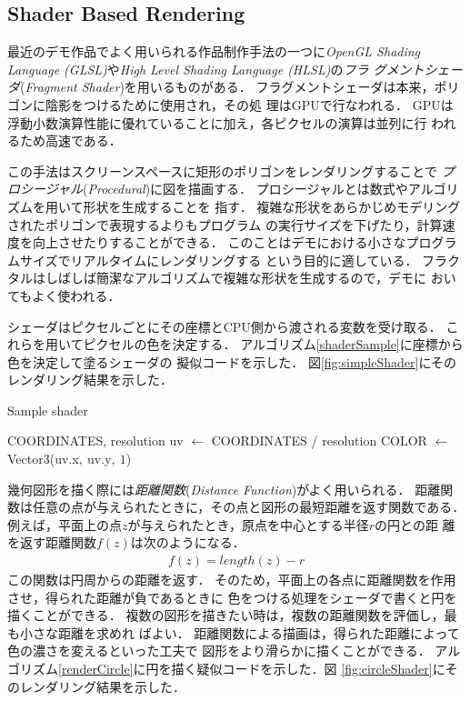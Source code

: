 \subsection{Shader Based Rendering}

最近のデモ作品でよく用いられる作品制作手法の一つに\textit{OpenGL Shading
Language (GLSL)}や\textit{High Level Shading Language (HLSL)}の\emph{フラ
グメントシェーダ}(\textit{Fragment Shader})を用いるものがある．
フラグメントシェーダは本来，ポリゴンに陰影をつけるために使用され，その処
理はGPUで行なわれる．
GPUは浮動小数演算性能に優れていることに加え，各ピクセルの演算は並列に行
われるため高速である．

この手法はスクリーンスペースに矩形のポリゴンをレンダリングすることで
\emph{プロシージャル}(\textit{Procedural})に図を描画する．
プロシージャルとは数式やアルゴリズムを用いて形状を生成することを
指す．
複雑な形状をあらかじめモデリングされたポリゴンで表現するよりもプログラム
の実行サイズを下げたり，計算速度を向上させたりすることができる．
このことはデモにおける小さなプログラムサイズでリアルタイムにレンダリングする
という目的に適している．
フラクタルはしばしば簡潔なアルゴリズムで複雑な形状を生成するので，デモに
おいてもよく使われる．

シェーダはピクセルごとにその座標とCPU側から渡される変数を受け取る．
これらを用いてピクセルの色を決定する．
アルゴリズム\ref{shaderSample}に座標から色を決定して塗るシェーダの
擬似コードを示した．
図\ref{fig:simpleShader}にそのレンダリング結果を示した．
\begin{algorithm}
 \begin{algorithmic}
  \begin{minipage}{0.5\hsize}
   \caption{Sample shader}
   \label{shaderSample}
   \REQUIRE COORDINATES, resolution
   \STATE uv $\leftarrow$ COORDINATES / resolution
   \STATE COLOR $\leftarrow$ Vector3(uv.x$,~$uv.y$,~1$)
  \end{minipage}
 \end{algorithmic}
\end{algorithm}

幾何図形を描く際には\emph{距離関数}(\textit{Distance Function})がよく用いられる．
距離関数は任意の点が与えられたときに，その点と図形の最短距離を返す関数である．
例えば，平面上の点$z$が与えられたとき，原点を中心とする半径$r$の円との距
離を返す距離関数$f(z)$は次のようになる．
\begin{align*}
 f(z) =  length(z) - r
\end{align*}
この関数は円周からの距離を返す．
そのため，平面上の各点に距離関数を作用させ，得られた距離が負であるときに
色をつける処理をシェーダで書くと円を描くことができる．
複数の図形を描きたい時は，複数の距離関数を評価し，最も小さな距離を求めれ
ばよい．
距離関数による描画は，得られた距離によって色の濃さを変えるといった工夫で
図形をより滑らかに描くことができる．
アルゴリズム\ref{renderCircle}に円を描く疑似コードを示した．図
\ref{fig:circleShader}にそのレンダリング結果を示した．

